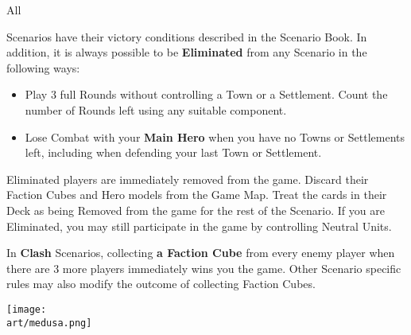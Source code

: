 
\begin{multicols*}{2}

\hypertarget{End}{All} Scenarios have their victory conditions described in the Scenario Book.
In addition, it is always possible to be \textbf{Eliminated} from any Scenario in the following ways:
\begin{itemize}
  \item Play 3 full Rounds without controlling a Town or a Settlement.
    Count the number of Rounds left using any suitable component.
  \item Lose Combat with your \textbf{Main Hero} when you have no Towns or Settlements left, including when defending your last Town or Settlement.
\end{itemize}
Eliminated players are immediately removed from the game.
Discard their Faction Cubes and Hero models from the Game Map.
Treat the cards in their Deck as being Removed from the game for the rest of the Scenario.
If you are Eliminated, you may still participate in the game by controlling Neutral Units.\par
{}\par

\columnbreak

In \textbf{Clash} Scenarios, collecting \textbf{a Faction Cube} from every enemy player when there are 3 more players immediately wins you the game.
Other Scenario specific rules may also modify the outcome of collecting Faction Cubes.

\vspace*{\fill}
\hspace{-6em}
\texttt{[image: \\art/medusa.png]}

\end{multicols*}
